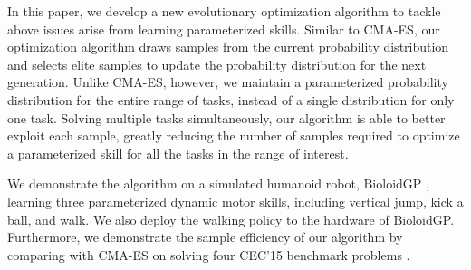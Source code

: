 In this paper, we develop a new evolutionary optimization algorithm to
tackle above issues arise from learning parameterized skills. Similar
to CMA-ES, our optimization algorithm draws samples from the current
probability distribution and selects elite samples to update the
probability distribution for the next generation. Unlike CMA-ES,
however, we maintain a parameterized probability distribution for the
entire range of tasks, instead of a single distribution for only one
task. Solving multiple tasks simultaneously, our algorithm is able to
better exploit each sample, greatly reducing the number of samples
required to optimize a parameterized skill for all the tasks in the
range of interest.

We demonstrate the algorithm on a simulated humanoid robot, BioloidGP
\cite{BioloidGP:2014:URL}, learning three parameterized dynamic motor
skills, including vertical jump, kick a ball, and walk. We also deploy
the walking policy to the hardware of BioloidGP. Furthermore, we
demonstrate the sample efficiency of our algorithm by comparing with
CMA-ES on solving four CEC'15 benchmark problems \cite{Chen:2015:CEC}.





